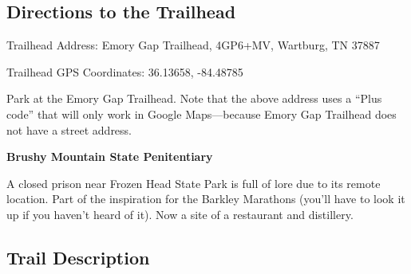 \documentclass[
  letterpaper,
  DIV=11,
  numbers=noendperiod]{scrreprt}
\begin{document}
\subsection{Directions to the
Trailhead}\label{directions-to-the-trailhead-11}

Trailhead Address: Emory Gap Trailhead, 4GP6+MV, Wartburg, TN 37887

Trailhead GPS Coordinates: 36.13658, -84.48785

Park at the Emory Gap Trailhead. Note that the above address uses a
``Plus code'' that will only work in Google Maps---because Emory Gap
Trailhead does not have a street address.

\begin{tcolorbox}[enhanced jigsaw, left=2mm, colback=white, breakable, opacityback=0, arc=.35mm, rightrule=.15mm, leftrule=.75mm, toprule=.15mm, colframe=quarto-callout-note-color-frame, bottomrule=.15mm]
\begin{minipage}[t]{5.5mm}
\textcolor{quarto-callout-note-color}{\faInfo}
\end{minipage}%
\begin{minipage}[t]{\textwidth - 5.5mm}

\vspace{-3mm}\textbf{Brushy Mountain State Penitentiary}\vspace{3mm}

A closed prison near Frozen Head State Park is full of lore due to its
remote location. Part of the inspiration for the Barkley Marathons
(you'll have to look it up if you haven't heard of it). Now a site of a
restaurant and distillery.

\end{minipage}%
\end{tcolorbox}

\subsection{Trail Description}\label{trail-description-12}
\end{document}
